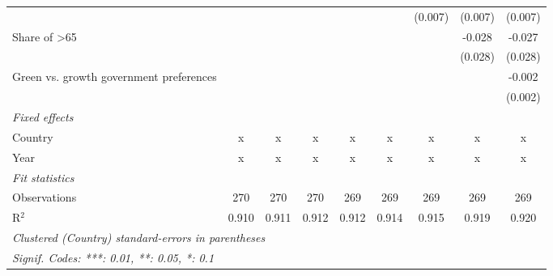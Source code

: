 \begin{table}[htbp]
\begin{tabular}{lcccccccc}
                                              &         &         &         &         &             & (0.007)     & (0.007)     & (0.007)\\   
      Share of >65                            &         &         &         &         &             &             & -0.028      & -0.027\\   
                                              &         &         &         &         &             &             & (0.028)     & (0.028)\\   
      Green vs. growth government preferences &         &         &         &         &             &             &             & -0.002\\   
                                              &         &         &         &         &             &             &             & (0.002)\\   
      \emph{Fixed effects}\\
      Country                                 & x       & x       & x       & x       & x           & x           & x           & x\\  
      Year                                    & x       & x       & x       & x       & x           & x           & x           & x\\  
      \midrule \emph{Fit statistics}\\
      Observations                            & 270     & 270     & 270     & 269     & 269         & 269         & 269         & 269\\  
      R$^2$                                   & 0.910   & 0.911   & 0.912   & 0.912   & 0.914       & 0.915       & 0.919       & 0.920\\  
      \midrule
      \multicolumn{9}{l}{\emph{Clustered (Country) standard-errors in parentheses}}\\
      \multicolumn{9}{l}{\emph{Signif. Codes: ***: 0.01, **: 0.05, *: 0.1}}\\
   \end{tabular}
\end{table}


